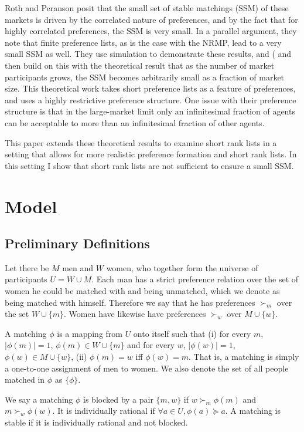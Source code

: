 \documentclass[WP]{AEA}
\begin{document}
Roth and Peranson posit that the small set of stable matchings (SSM) of these markets is driven by the correlated nature of preferences, and by the fact that for highly correlated preferences, the SSM is very small.  In a parallel argument, they note that finite preference lists, as is the case with the NRMP, lead to a very small SSM as well.  They use simulation to demonstrate these results, and (\cite{Immorlica2005} and then \cite{Kojima2009} build on this with the theoretical result that as the number of market participants grows, the SSM becomes arbitrarily small as a fraction of market size. This theoretical work takes short preference lists as a feature of preferences, and uses a highly restrictive preference structure. One issue with their preference structure is that in the large-market limit only an infinitesimal fraction of agents can be acceptable to more than an infinitesimal fraction of other agents.

This paper extends these theoretical results to examine short rank lists in a setting that allows for more realistic preference formation and short rank lists. In this setting I show that short rank lists are not sufficient to ensure a small SSM. 


\section{Model}
\subsection{Preliminary Definitions}

Let there be $M$ men and $W$ women, who together form the universe of participants $U = W \cup M$.  Each man has a strict preference relation over the set of women he could be matched with and being unmatched, which we denote as being matched with himself. Therefore we say that he has preferences $\succ_{m}$ over the set $W \cup \{m\}$. Women have likewise have preferences $\succ_w$ over $M \cup \{w\}$. 

A matching $\phi$ is a mapping from $U$ onto itself such that (i) for every $m$, $|\phi(m)| = 1$, $\phi(m) \in W \cup \{m\} $ and for every  $w$, $|\phi(w)| = 1$, $\phi(w) \in M \cup \{w\}$, (ii) $\phi(m) = w$ iff $\phi(w) = m$.  That is, a matching is simply a one-to-one assignment of men to women. We also denote the set of all people matched in $\phi$ as $\{\phi\}$.

We say a matching $\phi$ is blocked by a pair $\{m,w\}$ if $w \succ_m \phi(m)$ and $m \succ_w \phi(w)$. It is individually rational if $\forall a \in U ,\phi(a) \succeq a$. A matching is stable if it is individually rational and not blocked.
\end{document}
